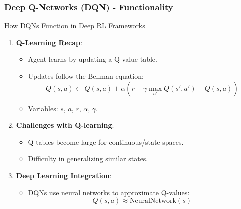 \documentclass[aspectratio=169]{beamer}
\begin{document}
\begin{frame}[fragile]
  \frametitle{Deep Q-Networks (DQN) - Functionality}
  \begin{block}{How DQNs Function in Deep RL Frameworks}
    \begin{enumerate}
      \item \textbf{Q-Learning Recap}:
        \begin{itemize}
          \item Agent learns by updating a Q-value table.
          \item Updates follow the Bellman equation:
            \begin{equation}
              Q(s, a) \leftarrow Q(s, a) + \alpha \left( r + \gamma \max_{a'} Q(s', a') - Q(s, a) \right)
            \end{equation}
          \item Variables: \( s \), \( a \), \( r \), \( \alpha \), \( \gamma \).
        \end{itemize}
  
      \item \textbf{Challenges with Q-learning}:
        \begin{itemize}
          \item Q-tables become large for continuous/state spaces.
          \item Difficulty in generalizing similar states.
        \end{itemize}

      \item \textbf{Deep Learning Integration}:
        \begin{itemize}
          \item DQNs use neural networks to approximate Q-values:
            \begin{equation}
              Q(s, a) \approx \text{NeuralNetwork}(s)
            \end{equation}
        \end{itemize}
    \end{enumerate}
  \end{block}
\end{frame}
\end{document}
